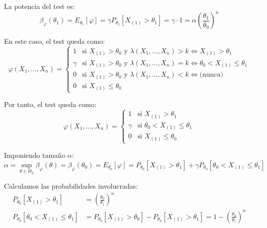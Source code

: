 \begin{ejercicio}
\begin{description}
\begin{description}
            La potencia del test es:
            \begin{equation*}
                \beta_\varphi(\theta_1) = E_{\theta_1}[\varphi] = \gamma P_{\theta_1}[X_{(1)} > \theta_1] = \gamma \cdot 1 = \alpha\left(\frac{\theta_1}{\theta_0}\right)^n
            \end{equation*}

            \item[Subcaso $k = 0$.] En este caso, el test queda como:
            \begin{equation*}
                \varphi(X_1, \ldots, X_n) = \left\{\begin{array}{ll}
                    1 & \text{si\ } X_{(1)} > \theta_0 \text{\ y\ } \lambda(X_1, \ldots, X_n) > k \iff X_{(1)} > \theta_1 \\
                    \gamma & \text{si\ } X_{(1)} > \theta_0 \text{\ y\ } \lambda(X_1, \ldots, X_n) = k \iff \theta_0 < X_{(1)} \leq \theta_1 \\
                    0 & \text{si\ } X_{(1)} > \theta_0 \text{\ y\ } \lambda(X_1, \ldots, X_n) < k \iff \text{(nunca)} \\
                    0 & \text{si\ } X_{(1)} \leq \theta_0
                \end{array}\right.
            \end{equation*}

            Por tanto, el test queda como:
            \begin{equation*}
                \varphi(X_1, \ldots, X_n) = \left\{\begin{array}{ll}
                    1 & \text{si\ } X_{(1)} > \theta_1 \\
                    \gamma & \text{si\ } \theta_0 < X_{(1)} \leq \theta_1 \\
                    0 & \text{si\ } X_{(1)} \leq \theta_0
                \end{array}\right.
            \end{equation*}

            Imponiendo tamaño $\alpha$:
            \begin{equation*}
                \alpha = \sup_{\theta \in \Theta_0}\beta_\varphi(\theta) = \beta_\varphi(\theta_0) = E_{\theta_0}[\varphi] = P_{\theta_0}[X_{(1)} > \theta_1] + \gamma P_{\theta_0}[\theta_0 < X_{(1)} \leq \theta_1]
            \end{equation*}

            Calculamos las probabilidades involucradas:
            \begin{align*}
                P_{\theta_0}[X_{(1)} > \theta_1] &= \left(\frac{\theta_0}{\theta_1}\right)^n \\
                P_{\theta_0}[\theta_0 < X_{(1)} \leq \theta_1] &= P_{\theta_0}[X_{(1)} > \theta_0] - P_{\theta_0}[X_{(1)} > \theta_1] = 1 - \left(\frac{\theta_0}{\theta_1}\right)^n
            \end{align*}


\end{description}
\end{description}
\end{ejercicio}
